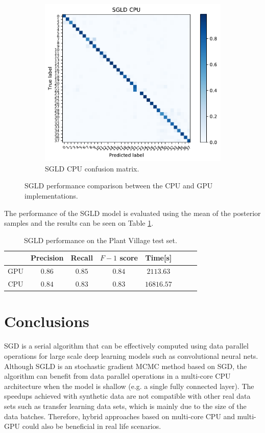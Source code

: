 \documentclass[conference]{IEEEtran}
\begin{document}
\begin{figure}
\begin{subfigure}[b]{0.2\textwidth}
		\includegraphics[width=\textwidth]{results/plants_confusion_matrix_sgld_cpu}
		\caption{SGLD CPU confusion matrix.}
		\label{fig:sgld_cpu_performance}
	\end{subfigure}
	\caption{SGLD performance comparison between the CPU and GPU implementations.}
\end{figure}

The performance of the SGLD model is evaluated using the mean of the posterior samples and the results can be seen on Table \ref{tab:performance}.


\begin{table}[h]
	\centering
	\begin{tabular}{|c|c|c|c|c|c|c|c|}
		\hline 
		& Precision & Recall & $F-1$ score & Time[s] \\ 
		\hline 
		GPU	 & $0.86$ & $0.85$ & $0.84$ & $2113.63$ \\ 
		\hline 
		CPU	 & $0.84$ & $0.83$ & $0.83$ & $16816.57$ \\ 
		\hline 
	\end{tabular}
	\caption{SGLD performance on the Plant Village test set.}
	\label{tab:performance} 
\end{table}


\section{Conclusions}
SGD is a serial algorithm that can be effectively computed using data parallel operations for large scale deep learning models such as convolutional neural nets. Although SGLD is an stochastic gradient MCMC method based on SGD, the algorithm can benefit from data parallel operations in a multi-core CPU architecture when the model is shallow (e.g. a single fully connected layer).  The speedups achieved with synthetic data are not compatible with other real data sets such as transfer learning data sets, which is mainly due to the size of the data batches. Therefore, hybrid approaches based on multi-core CPU and multi-GPU could also be beneficial in real life scenarios. 


\end{document}
